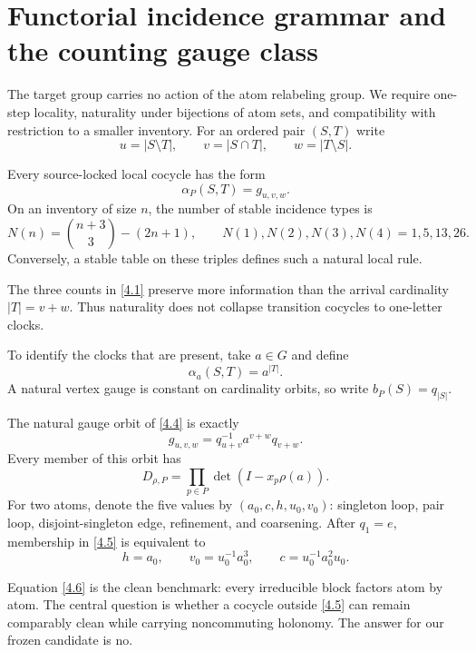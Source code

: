 \section{Functorial incidence grammar and the counting gauge class}
\label{sec:incidence}

The target group carries no action of the atom relabeling group.  We require
one-step locality, naturality under bijections of atom sets, and compatibility
with restriction to a smaller inventory.  For an ordered pair $(S,T)$ write
\[
 u=|S\setminus T|,\qquad v=|S\cap T|,\qquad w=|T\setminus S|.
 \tag{4.1}\label{4.1}
\]

\begin{theorem}
\label{thm:incidence}
Every source-locked local cocycle has the form
\[
 \alpha_P(S,T)=g_{u,v,w}.
 \tag{4.2}\label{4.2}
\]
On an inventory of size $n$, the number of stable incidence types is
\[
 N(n)=\binom{n+3}{3}-(2n+1),
 \qquad N(1),N(2),N(3),N(4)=1,5,13,26.
 \tag{4.3}\label{4.3}
\]
Conversely, a stable table on these triples defines such a natural local
rule.
\end{theorem}

The three counts in \eqref{4.1} preserve more information than the arrival
cardinality $|T|=v+w$.  Thus naturality does not collapse transition
cocycles to one-letter clocks.

To identify the clocks that are present, take $a\in G$ and define
\[
 \alpha_a(S,T)=a^{|T|}.
 \tag{4.4}\label{4.4}
\]
A natural vertex gauge is constant on cardinality orbits, so write
$b_P(S)=q_{|S|}$.

\begin{theorem}
\label{thm:count-gauge}
The natural gauge orbit of \eqref{4.4} is exactly
\[
 g_{u,v,w}=q_{u+v}^{-1}a^{v+w}q_{v+w}.
 \tag{4.5}\label{4.5}
\]
Every member of this orbit has
\[
 D_{\rho,P}=\prod_{p\in P}\det(I-x_p\rho(a)).
 \tag{4.6}\label{4.6}
\]
For two atoms, denote the five values by $(a_0,c,h,u_0,v_0)$: singleton
loop, pair loop, disjoint-singleton edge, refinement, and coarsening.  After
$q_1=e$, membership in \eqref{4.5} is equivalent to
\[
 h=a_0,\qquad v_0=u_0^{-1}a_0^3,\qquad
 c=u_0^{-1}a_0^2u_0.
 \tag{4.7}\label{4.7}
\]
\end{theorem}

Equation \eqref{4.6} is the clean benchmark: every irreducible block factors
atom by atom.  The central question is whether a cocycle outside
\eqref{4.5} can remain comparably clean while carrying noncommuting
holonomy.  The answer for our frozen candidate is no.
